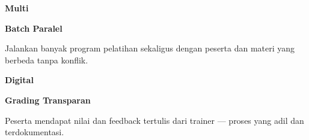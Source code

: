\documentclass[a4paper]{article}
\begin{document}
\begin{minipage}[t]{0.485\textwidth}
    \noindent\colorbox{BlueBg}{%
        \begin{minipage}[t][2.7cm][c]{\dimexpr\linewidth-2\fboxsep\relax}
            \centering
            {\fontsize{20}{24}\selectfont\bfseries\color{VioletPrimary} Multi}\par\vspace{2pt}
            {\fontsize{9.5}{12}\selectfont\bfseries\color{BlueDark} Batch Paralel}\par\vspace{2pt}
            {\fontsize{8.5}{11}\selectfont\color{TextDark}Jalankan banyak program pelatihan sekaligus dengan peserta dan materi yang berbeda tanpa konflik.}
        \end{minipage}}\par
    \vspace{6pt}
    \noindent\colorbox{BlueBg}{%
        \begin{minipage}[t][2.7cm][c]{\dimexpr\linewidth-2\fboxsep\relax}
            \centering
            {\fontsize{20}{24}\selectfont\bfseries\color{VioletPrimary} Digital}\par\vspace{2pt}
            {\fontsize{9.5}{12}\selectfont\bfseries\color{BlueDark} Grading Transparan}\par\vspace{2pt}
            {\fontsize{8.5}{11}\selectfont\color{TextDark}Peserta mendapat nilai dan feedback tertulis dari trainer --- proses yang adil dan terdokumentasi.}
        \end{minipage}}%
\end{minipage}

\vspace{8pt}
\end{document}
